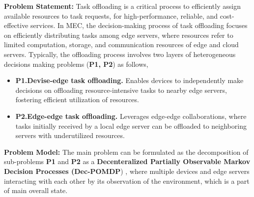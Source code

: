 \documentclass[12pt]{article}
\begin{document}
\vspace{2mm}

\noindent\textbf{\large Problem Statement: }
\noindent
Task offloading is a critical process to efficiently assign available resources to task requests, for high-performance, reliable, and cost-effective services. In MEC, the decision-making process of task offloading focuses on efficiently distributing tasks among edge servers, where resources refer to limited computation, storage, and communication resources of edge and cloud servers. Typically, the offloading process involves two layers of heterogeneous decisions making problems (\textbf{P1, P2}) as follows,
\vspace{-2mm}
\begin{itemize}
	\item\textbf{P1.\hspace{2mm}Devise-edge task offloading.} Enables devices to independently make decisions on offloading resource-intensive tasks to nearby edge servers, fostering efficient utilization of resources.\vspace{-2mm}
	\item\textbf{P2.\hspace{2mm}Edge-edge task offloading.} Leverages edge-edge collaborations, where tasks initially received by a local edge server can be offloaded to neighboring servers with underutilized resources. %
\end{itemize}

\noindent\textbf{\large Problem Model: }
\noindent
The main problem can be formulated as the decomposition of sub-problems \textbf{P1} and \textbf{P2} as a \textbf{Decenteralized Partially Observable Markov Decision Processes (Dec-POMDP}) \cite{oliehoek2016concise}, where multiple devices and edge servers interacting with each other by its observation of the environment, which is a part of main overall state. 

\vspace{3mm}
\end{document}
